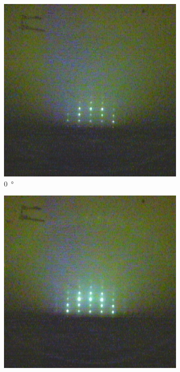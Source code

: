 \begin{figure}
    \centering
    \begin{subfigure}{0.2\linewidth}
        \includegraphics[width=\textwidth]{../data/edited/2_1_23deg.pdf}
        \caption{\qty{0}{\degree}}
    \end{subfigure}
    \begin{subfigure}{0.2\linewidth}
        \includegraphics[width=\textwidth]{../data/edited/2_1_83deg.pdf}

\end{subfigure}
\end{figure}

